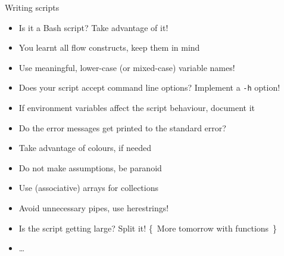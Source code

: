 
\begin{frame}{Writing scripts}
    \begin{itemize}
        \item Is it a Bash script? Take advantage of it!
        \item You learnt all flow constructs, keep them in mind
        \item Use meaningful, lower-case (or mixed-case) variable names!
        \item Does your script accept command line options? Implement a \texttt{-h} option!
        \item If environment variables affect the script behaviour, document it
        \item Do the error messages get printed to the standard error?
        \item Take advantage of colours, if needed
        \item Do not make assumptions, be paranoid
        \item Use (associative) arrays for collections
        \item Avoid unnecessary pipes, use herestrings!
        \item Is the script getting large? Split it! {\tiny\{~More tomorrow with functions~\}}
        \item \ldots
    \end{itemize}
\end{frame}
